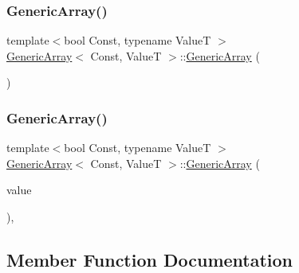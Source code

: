 \mbox{\label{classGenericArray_ab657142e2eb04a6be8e69d51c84c067a}} 
\subsubsection{\texorpdfstring{Generic\+Array()}{GenericArray()}\hspace{0.1cm}{\footnotesize\ttfamily [2/3]}}
{\footnotesize\ttfamily template$<$bool Const, typename ValueT $>$ \\
\hyperlink{classGenericArray}{Generic\+Array}$<$ Const, ValueT $>$\+::\hyperlink{classGenericArray}{Generic\+Array} (\begin{DoxyParamCaption}{ }\end{DoxyParamCaption})\hspace{0.3cm}{\ttfamily [private]}}

\mbox{\label{classGenericArray_aefb32b089262f573804bea9faa9c6a22}} 
\subsubsection{\texorpdfstring{Generic\+Array()}{GenericArray()}\hspace{0.1cm}{\footnotesize\ttfamily [3/3]}}
{\footnotesize\ttfamily template$<$bool Const, typename ValueT $>$ \\
\hyperlink{classGenericArray}{Generic\+Array}$<$ Const, ValueT $>$\+::\hyperlink{classGenericArray}{Generic\+Array} (\begin{DoxyParamCaption}\item[{\hyperlink{classGenericArray_a93e53f38a99fc5167eb2a28653de64ed}{Value\+Type} \&}]{value }\end{DoxyParamCaption})\hspace{0.3cm}{\ttfamily [inline]}, {\ttfamily [private]}}



\subsection{Member Function Documentation}
\mbox{\label{classGenericArray_a3efaa020b29ceed9c1a03465676a32a7}} 
